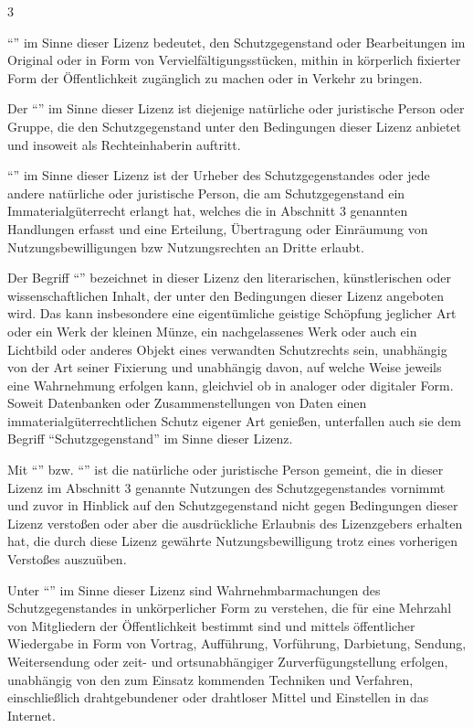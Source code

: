 \begin{WidePar}
\begin{multicols}{3}
\begin{description}
  \enquote{} im Sinne dieser Lizenz
  bedeutet, den Schutzgegenstand oder Bearbeitungen im Original oder
  in Form von Vervielfältigungsstücken, mithin in
  körperlich fixierter Form der Öffentlichkeit zugänglich
  zu machen oder in Verkehr zu bringen.
  
  Der \enquote{} im Sinne dieser Lizenz
  ist diejenige natürliche oder juristische Person oder
  Gruppe, die den Schutzgegenstand unter den Bedingungen
  dieser Lizenz anbietet und insoweit als Rechteinhaberin
  auftritt.
  
  \enquote{} im Sinne dieser Lizenz ist
  der Urheber des Schutzgegenstandes oder jede andere
  natürliche oder juristische Person, die am
  Schutzgegenstand ein Immaterialgüterrecht erlangt hat,
  welches die in Abschnitt 3 genannten Handlungen erfasst
  und eine Erteilung, Übertragung oder Einräumung von
  Nutzungsbewilligungen bzw Nutzungsrechten an Dritte
  erlaubt.
  
  Der Begriff \enquote{} bezeichnet
  in dieser Lizenz den literarischen, künstlerischen oder
  wissenschaftlichen Inhalt, der unter den Bedingungen
  dieser Lizenz angeboten wird. Das kann insbesondere eine
  eigentümliche geistige Schöpfung jeglicher Art oder ein
  Werk der kleinen Münze, ein nachgelassenes Werk oder
  auch ein Lichtbild oder anderes Objekt eines verwandten
  Schutzrechts sein, unabhängig von der Art seiner
  Fixierung und unabhängig davon, auf welche Weise jeweils
  eine Wahrnehmung erfolgen kann, gleichviel ob in
  analoger oder digitaler Form. Soweit Datenbanken oder
  Zusammenstellungen von Daten einen
  immaterialgüterrechtlichen Schutz eigener Art genießen,
  unterfallen auch sie dem Begriff \enquote{Schutzgegenstand} im
  Sinne dieser Lizenz.
  
  Mit \enquote{} bzw. \enquote{} ist die
  natürliche oder juristische Person gemeint, die in
  dieser Lizenz im Abschnitt 3 genannte Nutzungen des
  Schutzgegenstandes vornimmt und zuvor in Hinblick auf
  den Schutzgegenstand nicht gegen Bedingungen dieser
  Lizenz verstoßen oder aber die ausdrückliche Erlaubnis
  des Lizenzgebers erhalten hat, die durch diese Lizenz
  gewährte Nutzungsbewilligung trotz eines vorherigen
  Verstoßes auszuüben.
  
  Unter \enquote{} im Sinne
  dieser Lizenz sind Wahrnehmbarmachungen des Schutzgegenstandes
  in unkörperlicher Form zu verstehen, die für eine
  Mehrzahl von Mitgliedern der Öffentlichkeit bestimmt
  sind und mittels öffentlicher Wiedergabe in Form von
  Vortrag, Aufführung, Vorführung, Darbietung, Sendung,
  Weitersendung oder zeit- und ortsunabhängiger
  Zurverfügungstellung erfolgen, unabhängig von den zum
  Einsatz kommenden Techniken und Verfahren,
  einschließlich drahtgebundener oder drahtloser Mittel
  und Einstellen in das Internet.
  

\end{description}
\end{multicols}
\end{WidePar}
